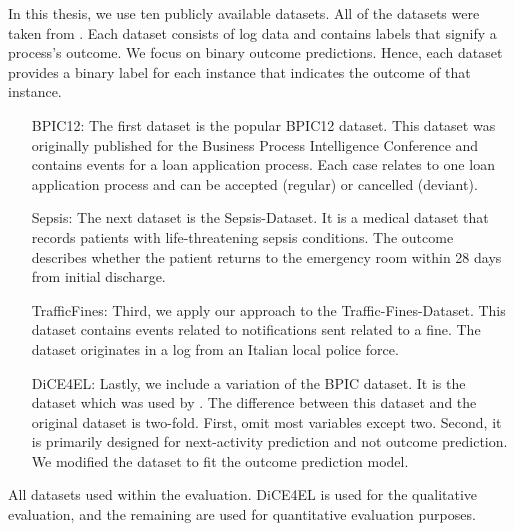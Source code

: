 \documentclass[./../../paper.tex]{subfiles}
\begin{document}
In this thesis, we use ten publicly available datasets. All of the datasets were taken from \citeauthor{teinemaa_OutcomeOrientedPredictiveProcess_2018a}. Each dataset consists of log data and contains labels that signify a process's outcome. We focus on binary outcome predictions. Hence, each dataset provides a binary label for each \gls{instance} that indicates the outcome of that \gls{instance}. 

\begin{enumerate}
    \item[BPIC12:] The first dataset is the popular BPIC12 dataset. This dataset was originally published for the Business Process Intelligence Conference and contains events for a loan application process. Each case relates to one loan application process and can be accepted (regular) or cancelled (deviant).
    \item[Sepsis:] The next dataset is the Sepsis-Dataset. It is a medical dataset that records patients with life-threatening sepsis conditions. The outcome describes whether the patient returns to the emergency room within 28 days from initial discharge.
    \item[TrafficFines:] Third, we apply our approach to the Traffic-Fines-Dataset. This dataset contains events related to notifications sent related to a fine. The dataset originates in a log from an Italian local police force.
    \item[DiCE4EL:] Lastly, we include a variation of the BPIC dataset. It is the dataset which was used by \citeauthor{hsieh_DiCE4ELInterpretingProcess_2021}. The difference between this dataset and the original dataset is two-fold. First, \citeauthor{hsieh_DiCE4ELInterpretingProcess_2021} omit most variables except two. Second, it is primarily designed for next-activity prediction and not outcome prediction. We modified the dataset to fit the outcome prediction model.
\end{enumerate}

\begin{table}[htbp]
        \makebox[\linewidth]{
            
            }
            \caption{All datasets used within the evaluation. DiCE4EL is used for the qualitative evaluation, and the remaining are used for quantitative evaluation purposes.}
            \label{tbl:dataset-stats}
\end{table}
\end{document}
